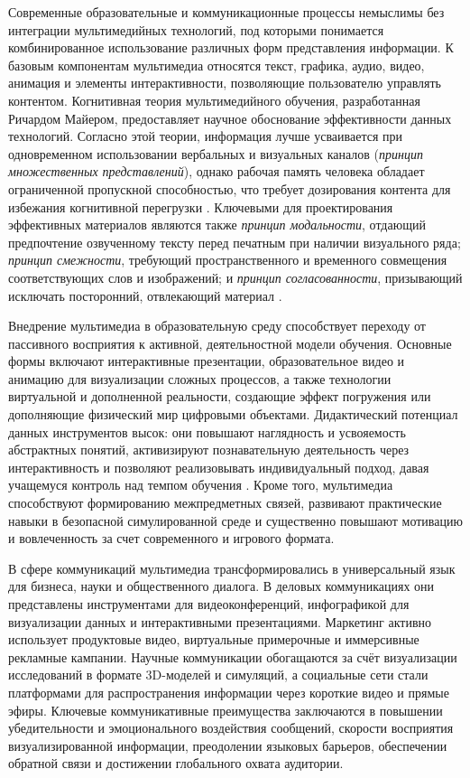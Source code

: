 \documentclass{SibFU-docs}
\begin{document}
Современные образовательные и коммуникационные процессы немыслимы без интеграции мультимедийных технологий, под которыми понимается комбинированное использование различных форм представления информации. К базовым компонентам мультимедиа относятся текст, графика, аудио, видео, анимация и элементы интерактивности, позволяющие пользователю управлять контентом. Когнитивная теория мультимедийного обучения, разработанная Ричардом Майером, предоставляет научное обоснование эффективности данных технологий. Согласно этой теории, информация лучше усваивается при одновременном использовании вербальных и визуальных каналов (\textit{принцип множественных представлений}), однако рабочая память человека обладает ограниченной пропускной способностью, что требует дозирования контента для избежания когнитивной перегрузки \cite{sweller-cognitive-load, mayer-principles}. Ключевыми для проектирования эффективных материалов являются также \textit{принцип модальности}, отдающий предпочтение озвученному тексту перед печатным при наличии визуального ряда; \textit{принцип смежности}, требующий пространственного и временного совмещения соответствующих слов и изображений; и \textit{принцип согласованности}, призывающий исключать посторонний, отвлекающий материал \cite{mayer-principles}.


Внедрение мультимедиа в образовательную среду способствует переходу от пассивного восприятия к активной, деятельностной модели обучения. Основные формы включают интерактивные презентации, образовательное видео и анимацию для визуализации сложных процессов, а также технологии виртуальной и дополненной реальности, создающие эффект погружения или дополняющие физический мир цифровыми объектами. Дидактический потенциал данных инструментов высок: они повышают наглядность и усвояемость абстрактных понятий, активизируют познавательную деятельность через интерактивность и позволяют реализовывать индивидуальный подход, давая учащемуся контроль над темпом обучения \cite{horizon-report}. Кроме того, мультимедиа способствуют формированию межпредметных связей, развивают практические навыки в безопасной симулированной среде и существенно повышают мотивацию и вовлеченность за счет современного и игрового формата.


В сфере коммуникаций мультимедиа трансформировались в универсальный язык для бизнеса, науки и общественного диалога. В деловых коммуникациях они представлены инструментами для видеоконференций, инфографикой для визуализации данных и интерактивными презентациями. Маркетинг активно использует продуктовые видео, виртуальные примерочные и иммерсивные рекламные кампании. Научные коммуникации обогащаются за счёт визуализации исследований в формате 3D-моделей и симуляций, а социальные сети стали платформами для распространения информации через короткие видео и прямые эфиры. Ключевые коммуникативные преимущества заключаются в повышении убедительности и эмоционального воздействия сообщений, скорости восприятия визуализированной информации, преодолении языковых барьеров, обеспечении обратной связи и достижении глобального охвата аудитории.
\end{document}
